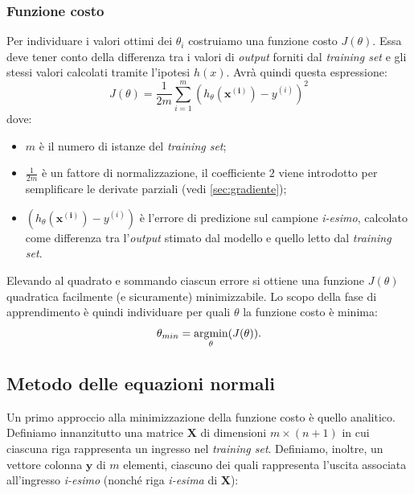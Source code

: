 \subsubsection{Funzione costo}
Per individuare i valori ottimi dei $\theta_i$ costruiamo una funzione costo $J(\theta)$. Essa deve tener conto della differenza tra i valori di \emph{output} forniti dal \emph{training set} e gli stessi valori calcolati tramite l'ipotesi $h(x)$. Avrà quindi questa espressione:
\begin{equation}\label{eqJ_theta_semplice}
  J(\theta) = \frac{1}{2m} \sum_{i=1}^m (h_\theta(\mathbf{x^{(i)}})-y^{(i)})^2
\end{equation}
dove:
\begin{itemize}
  \item $m$ è il numero di istanze del \emph{training set};
  \item $\frac{1}{2m}$ è un fattore di normalizzazione, il coefficiente $2$ viene introdotto per semplificare le derivate parziali (vedi \autoref{sec:gradiente});
  \item $(h_\theta(\mathbf{x^{(i)}})-y^{(i)})$ è l'errore di predizione sul campione \emph{i-esimo}, calcolato come differenza tra l'\emph{output} stimato dal modello e quello letto dal \emph{training set}.
\end{itemize}
Elevando al quadrato e sommando ciascun errore si ottiene una funzione $J(\theta)$ quadratica  facilmente (e sicuramente) minimizzabile. Lo scopo della fase di apprendimento è quindi individuare per quali $\theta$ la funzione costo è minima:
\begin{equation*}
  \theta_{min} = \operatorname*{arg\!\min}_\theta( J(\theta)).
\end{equation*}

\subsection{Metodo delle equazioni normali}
Un primo approccio alla minimizzazione della funzione costo è quello analitico.
Definiamo innanzitutto una matrice $\mathbf{X}$ di dimensioni $m \times (n+1)$ in cui ciascuna riga rappresenta un ingresso nel \emph{training set}. Definiamo, inoltre, un vettore colonna $\mathbf{y}$ di $m$ elementi, ciascuno dei quali rappresenta l'uscita associata all'ingresso \emph{i-esimo} (nonché riga \emph{i-esima} di $\mathbf{X}$):

